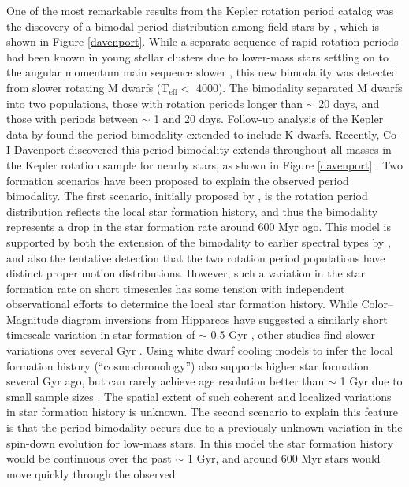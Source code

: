 \documentclass[useAMS, usenatbib, preprint, 12pt]{aastex}
\newcommand{\eg}{{\it e.g.}}
\begin{document}
One of the most remarkable results from the Kepler rotation period catalog was
the discovery of a bimodal period distribution among field stars by
\citet{mcquillan2013}, which is shown in Figure \ref{davenport}.
While a separate sequence of rapid rotation periods had been known in young
stellar clusters due to lower-mass stars settling on to the angular momentum
main sequence slower \citep[\eg][]{barnes2007}, this new bimodality was
detected from slower rotating M dwarfs (T$_\mathrm{eff} <$ 4000).
The bimodality separated M dwarfs into two populations, those with rotation
periods longer than $\sim$ 20 days, and those with periods between $\sim$ 1
and 20 days.
Follow-up analysis of the Kepler data by \citet{mcquillan2014} found the
period bimodality extended to include K dwarfs.
Recently, Co-I Davenport discovered this period bimodality extends throughout
all masses in the Kepler rotation sample for nearby stars, as shown in Figure
\ref{davenport} \citep{davenport2017}.
Two formation scenarios have been proposed to explain the observed period
bimodality.
The first scenario, initially proposed by \citet{mcquillan2013}, is the
rotation period distribution reflects the local star formation history, and
thus the bimodality represents a drop in the star formation rate around 600
Myr ago.
This model is supported by both the extension of the bimodality to earlier
spectral types by \citet{davenport2017}, and also the tentative detection that
the two rotation period populations have distinct proper motion distributions.
However, such a variation in the star formation rate on short timescales has
some tension with independent observational efforts to determine the local
star formation history.
While Color–Magnitude diagram inversions from Hipparcos have suggested a
similarly short timescale variation in star formation of $\sim$ 0.5 Gyr
\citep{hernandez2000}, other studies find slower variations over several
Gyr \citep[\eg][]{cignoni2006}.
Using white dwarf cooling models to infer the local formation history
(“cosmochronology”) also supports higher star formation several Gyr ago, but
can rarely achieve age resolution better than $\sim$ 1 Gyr due to small sample
sizes \citep{tremblay2014}.
The spatial extent of such coherent and localized variations in star formation
history is unknown.
The second scenario to explain this feature is that the period bimodality
occurs due to a previously unknown variation in the spin-down evolution for
low-mass stars.
In this model the star formation history would be continuous over the past
$\sim$ 1 Gyr, and around 600 Myr stars would move quickly through the observed
\end{document}
